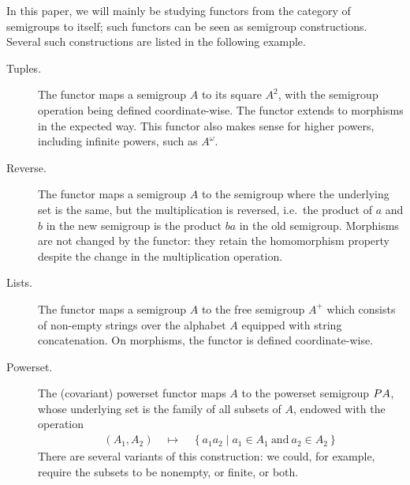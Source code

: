  \begin{example}\label{ex:functors}
    In this paper, we will mainly be studying functors from the category of semigroups to itself; such functors can be seen as semigroup constructions.  Several such constructions are listed in the following example. 
    \begin{description}
        \item[Tuples.] The functor maps a semigroup $A$ to its square $A^2$, with the semigroup operation being defined coordinate-wise. The functor extends to morphisms in the expected way. This functor also makes sense for higher powers, including infinite powers, such as $A^\omega$.
        \item[Reverse.] The functor maps a semigroup $A$ to the semigroup where the underlying set is the same, but the multiplication is reversed, i.e.~the product of $a$ and $b$ in the new semigroup is the product $ba$ in the old semigroup. Morphisms are not changed by the functor: they retain the homomorphism property despite the change in the multiplication operation.
        \item[Lists.] The functor maps a semigroup $A$ to the free semigroup $A^+$ which consists of non-empty strings over the alphabet $A$  equipped with string concatenation. On morphisms, the functor is defined coordinate-wise. 
        \item[Powerset.] The (covariant) powerset functor maps $A$ to the powerset semigroup $\powerset A$, whose underlying set is the family of all subsets of $A$, endowed with the operation
        \begin{align*}
        (A_1,A_2) \quad \mapsto \quad \left\{a_1 a_2 \mid a_1 \in A_1\ \text{and}\ a_2 \in A_2\right\}
        \end{align*}
        There are several variants of this construction: we could, for example,  require the subsets to be nonempty, or finite, or both.
    \end{description}
 \end{example}

